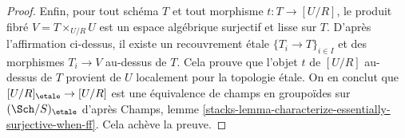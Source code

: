 \begin{proof}
\medskip\noindent
Enfin, pour tout schéma $T$ et tout morphisme $t : T \to [U/R]$, le produit fibré
$V = T \times_{U/R} U$ est un espace algébrique surjectif et lisse sur $T$.
D'après l'affirmation ci-dessus, il existe un recouvrement étale $\{T_i \to T\}_{i \in I}$
et des morphismes $T_i \to V$ au-dessus de $T$. Cela prouve que l'objet
$t$ de $[U/R]$ au-dessus de $T$ provient de $U$ localement pour la topologie étale. On en conclut que
$[U/R]_\etale \to [U/R]$ est une équivalence de champs en
groupoïdes sur $(\Sch/S)_\etale$ d'après
Champs, lemme \ref{stacks-lemma-characterize-essentially-surjective-when-ff}.
Cela achève la preuve.
\end{proof}
















